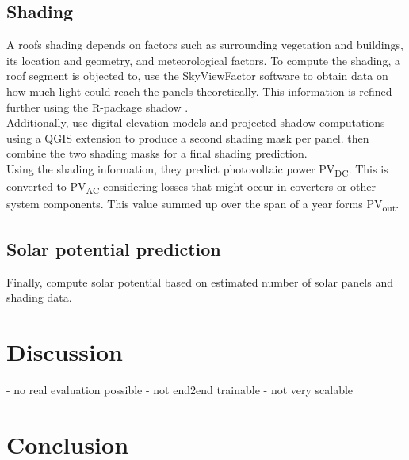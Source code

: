 \documentclass{article} %
\begin{document}
\subsection*{Shading}
A roofs shading depends on factors such as surrounding vegetation and buildings, its location and geometry, and meteorological factors. To compute the shading, a roof segment is objected to, \citet{de2021predicting} use the SkyViewFactor software \cite{zakvsek2011sky} to obtain data on how much light could reach the panels theoretically. This information is refined further using the R-package shadow \cite{dorman2019shadow}.\\
Additionally, \citet{de2021predicting} use digital elevation models and projected shadow computations using a QGIS extension \cite{qgis,qgisshadows} to produce a second shading mask per panel. \citet{de2021predicting} then combine the two shading masks for a final shading prediction.\\
Using the shading information, they predict photovoltaic power \si{PV_{\si{DC}}}. This is converted to \si{PV_{\si{AC}}} considering losses that might occur in coverters or other system components. This value summed up over the span of a year forms \si{PV_{out}}.



\subsection*{Solar potential prediction}
Finally, \citet{de2021predicting} compute solar potential based on estimated number of solar panels and shading data.




\section*{Discussion}
- no real evaluation possible
- not end2end trainable
- not very scalable


\section*{Conclusion}


\newpage



\end{document}
